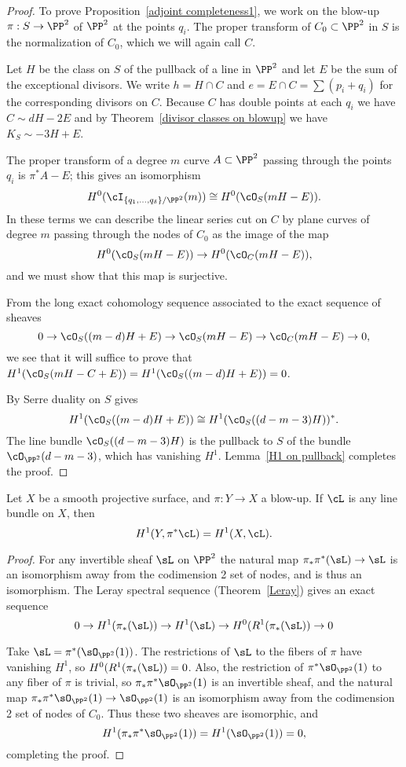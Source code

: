 \begin{proof}
To prove Proposition~\ref{adjoint completeness1}, we work on the blow-up $\pi : S \to \PP^2$ of $\PP^2$ at the points $q_i$. The proper transform of $C_0 \subset \PP^2$ in $S$ is the normalization of $C_0$, which we will again call $C$.

Let $H$ be the class on $S$ of the pullback of a line in $\PP^2$  and let $E$ be the sum of the exceptional divisors. We write $h= H\cap C$ and $e = E\cap C= \sum (p_i+q_i)$ for the corresponding divisors on $C$. 
Because $C$ has double points at each $q_{i}$ we have
$
C \sim dH - 2E 
$
and   by
Theorem~\ref{divisor classes on blowup} we have $K_S \sim -3H + E$.

The proper transform of a degree $m$ curve $A\subset \PP^2$  passing through the points $q_i$
is $\pi^*A - E$; this gives an isomorphism
$$
H^0(\cI_{\{q_1,\dots,q_\delta\}/\PP^2}(m)) \cong H^0(\cO_S(mH-E)).
$$
In these terms we can describe the linear series cut on $C$ by plane curves of degree $m$ passing through the nodes of $C_0$ as the image of the map
$$
H^0(\cO_S(mH-E)) \to H^0(\cO_C(mH-E)),
$$
and we must show that this map is surjective.

From the long exact cohomology sequence associated to the exact sequence of sheaves
$$
0 \to \cO_S((m-d)H + E)  \to \cO_S(mH-E) \to \cO_C(mH-E) \to 0,
$$
 we see that it will suffice to prove that $H^1(\cO_S(mH - C + E)) = H^1(\cO_S((m-d)H + E)) = 0$. 
 
By Serre duality on $S$ gives
$$
H^1(\cO_S((m-d)H + E)) \cong H^1(\cO_S((d-m-3)H))^*.
$$
The line bundle $\cO_S((d-m-3)H)$ is 
 the pullback to $S$ of the bundle $\cO_{\PP^2}(d-m-3)$, which has vanishing $H^1$. Lemma~\ref{H1 on pullback} completes the proof.
\end{proof}

\begin{lemma}\label{H1 on pullback}
Let $X$ be a smooth projective surface, and $\pi : Y \to X$ a blow-up. If $\cL$ is any line bundle on $X$, then
$$
H^1(Y, \pi^*\cL) = H^1(X, \cL).
$$
\end{lemma}
\begin{proof}
For any invertible sheaf $\sL$ on $\PP^{2}$ the natural map $\pi_{*}\pi^{*}(\sL) \to \sL$ is an isomorphism
away from the codimension 2 set of nodes, and is thus an isomorphism. The Leray spectral sequence (Theorem~\ref{Leray}) gives an exact sequence
$$
0\to H^{1}(\pi_{*}(\sL)) \to H^{1}(\sL) \to  H^{0}(R^{1}(\pi_{*}(\sL))\to 0
$$

Take $\sL = \pi^{*}(\sO_{\PP^{2}}(1))$. The restrictions of $\sL$ to the fibers of $\pi$ have vanishing $H^{1}$,
so
$H^{0}(R^{1}(\pi_{*}(\sL)) = 0$.
Also, the restriction of $\pi^{*}\sO_{\PP^{2}}(1)$ to any fiber of $\pi$ is trivial,
so $\pi_{*}\pi^{*}\sO_{\PP^{2}}(1)$ is an invertible sheaf, and the natural map
$\pi_{*}\pi^{*}\sO_{\PP^{2}}(1) \to \sO_{\PP^{2}}(1)$ is an isomorphism away from the codimension
2 set of nodes of $C_{0}$. Thus these two sheaves are isomorphic, and
$$
H^{1}(\pi_{*}\pi^{*}\sO_{\PP^{2}}(1) ) = H^{1}(\sO_{\PP^{2}}(1)) = 0,
$$
completing the proof.
\end{proof}



